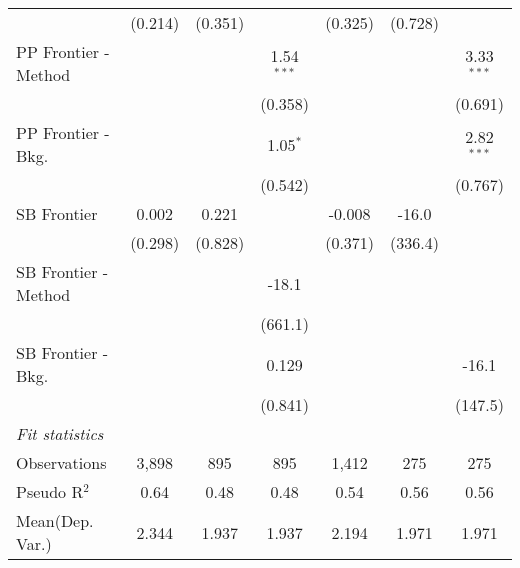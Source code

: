 \begin{tabular}{lcccccc}
                        & (0.214)      & (0.351)      &              & (0.325)       & (0.728)      &   \\   
   PP Frontier - Method &              &              & 1.54$^{***}$ &               &              & 3.33$^{***}$\\   
                        &              &              & (0.358)      &               &              & (0.691)\\   
   PP Frontier - Bkg.   &              &              & 1.05$^{*}$   &               &              & 2.82$^{***}$\\   
                        &              &              & (0.542)      &               &              & (0.767)\\   
   SB Frontier          & 0.002        & 0.221        &              & -0.008        & -16.0        &   \\   
                        & (0.298)      & (0.828)      &              & (0.371)       & (336.4)      &   \\   
   SB Frontier - Method &              &              & -18.1        &               &              &   \\   
                        &              &              & (661.1)      &               &              &   \\   
   SB Frontier - Bkg.   &              &              & 0.129        &               &              & -16.1\\   
                        &              &              & (0.841)      &               &              & (147.5)\\   
   \midrule
   \emph{Fit statistics}\\
   Observations         & 3,898        & 895          & 895          & 1,412         & 275          & 275\\  
   Pseudo R$^2$         & 0.64         & 0.48         & 0.48         & 0.54          & 0.56         & 0.56\\  
Mean(Dep. Var.) & 2.344 & 1.937 & 1.937 & 2.194 & 1.971 & 1.971 \\
   

\end{tabular}
